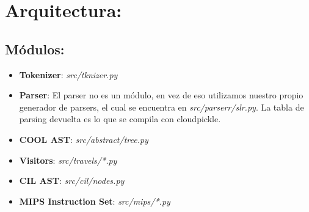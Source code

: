 \documentclass[a4paper, 12pt]{article}
\begin{document}
\section{Arquitectura:}

\subsection*{Módulos:}
\begin{itemize}
	\item \textbf{Tokenizer}: \textit{src/tknizer.py}
	\item \textbf{Parser}: El parser no es un m\'odulo, en vez de eso utilizamos nuestro
	propio generador de parsers, el cual se encuentra en \textit{src/parserr/slr.py}. La tabla de parsing
	devuelta es lo que se compila con cloudpickle.
	\item \textbf{COOL AST}: \textit{src/abstract/tree.py}
	\item \textbf{Visitors}: \textit{src/travels/*.py}
	\item \textbf{CIL AST}: \textit{src/cil/nodes.py}
	\item \textbf{MIPS Instruction Set}: \textit{src/mips/*.py}
\end{itemize}
\end{document}
